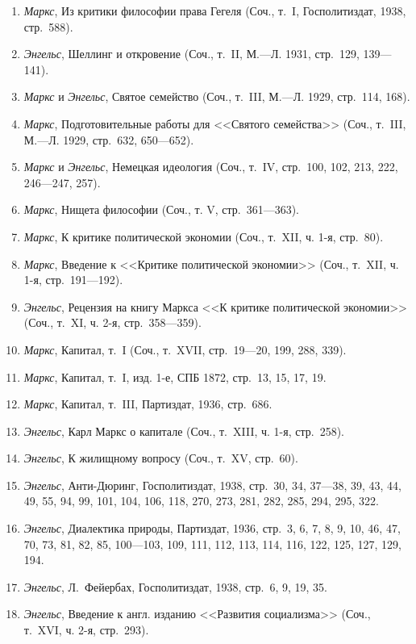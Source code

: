 \begin{enumerate}
\item {\em Маркс}, Из критики философии права Гегеля (Соч., т.~I, Госполитиздат,
1938, стр.~588).
\item {\em Энгельс}, Шеллинг и откровение (Соч., т.~II, М.---Л. 1931, стр.~129,
139---141).
\item {\em Маркс} и {\em Энгельс}, Святое семейство (Соч., т.~III, М.---Л. 1929,
стр.~114, 168).
\item {\em Маркс}, Подготовительные работы для <<Святого семейства>> (Соч.,
т.~III, М.---Л. 1929, стр.~632, 650---652).
\item {\em Маркс} и {\em Энгельс},
Немецкая идеология (Соч., т.~IV, стр.~100, 102, 213, 222,
246---247, 257).
\item {\em Маркс}, Нищета философии (Соч., т. V, стр.~361---363).
\item {\em Маркс}, К критике политической экономии (Соч., т.~XII, ч. 1-я,
стр.~80).
\item {\em Маркс}, Введение к <<Критике политической экономии>> (Соч., т.~XII, ч.
1-я, стр.~191---192).
\item {\em Энгельс}, Рецензия на книгу Маркса <<К критике политической экономии>>
(Соч., т.~XI, ч. 2-я, стр.~358---359).
\item {\em Маркс}, Капитал, т.~I (Соч., т.~XVII, стр.~19---20, 199, 288, 339).
\item {\em Маркс}, Капитал, т.~I, изд. 1-е, СПБ 1872, стр.~13, 15, 17, 19.
\item {\em Маркс}, Капитал, т.~III, Партиздат, 1936, стр.~686.
\item {\em Энгельс}, Карл Маркс о капитале (Соч., т.~XIII, ч. 1-я, стр.~258).
\item {\em Энгельс}, К жилищному вопросу (Соч., т.~XV, стр.~60).
\item {\em Энгельс}, Анти-Дюринг, Госполитиздат, 1938, стр.~30, 34, 37---38, 39, 43,
44, 49, 55, 94, 99, 101, 104, 106, 118, 270, 273, 281, 282, 285, 294, 295,
322.
\item {\em Энгельс}, Диалектика природы, Партиздат, 1936, стр.~3, 6, 7, 8, 9, 10,
46, 47, 70, 73, 81, 82, 85, 100---103, 109, 111, 112, 113, 114, 116, 122,
125, 127, 129, 194.
\item {\em Энгельс}, Л.~Фейербах, Госполитиздат, 1938, стр.~6, 9, 19, 35.
\item {\em Энгельс}, Введение к англ. изданию <<Развития социализма>> (Соч., т.~XVI,
ч. 2-я, стр.~293).
\end{enumerate}

